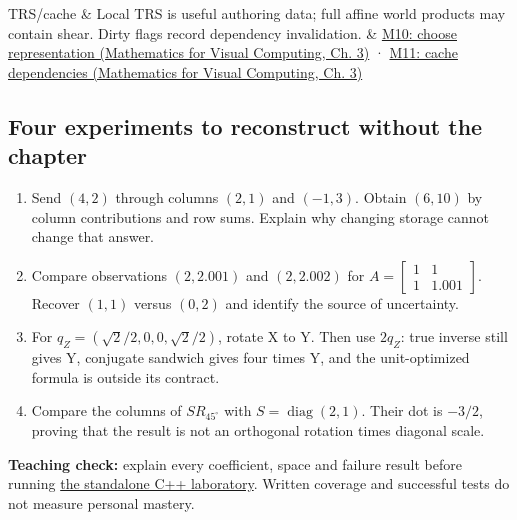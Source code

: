 {\begin{longtable}[]
TRS/cache & Local TRS is useful authoring data; full affine world products may contain shear. Dirty flags record dependency invalidation. & \href{../02-Mathematics-for-Visual-Computing/main.pdf\#nameddest=01-foundations-i-ch019-figure-m10---representation-follows-the-permitted-operation}{M10: choose representation (Mathematics for Visual Computing, Ch. 3)} · \href{../02-Mathematics-for-Visual-Computing/main.pdf\#nameddest=01-foundations-i-ch019-figure-m11---invalidate-the-values-that-actually-depend-on-the-edit}{M11: cache dependencies (Mathematics for Visual Computing, Ch. 3)} \\
\end{longtable}
}

\subsection{Four experiments to reconstruct without the chapter}\label{appendix-68f22c734be3-four-experiments-to-reconstruct-without-the-chapter}

\hypertarget{appendix-68f22c734be3-four-experiments-to-reconstruct-without-the-chapter}{}

\begin{enumerate}
\def\labelenumi{\arabic{enumi}.}
\tightlist
\item
  Send \((4,2)\) through columns \((2,1)\) and \((-1,3)\). Obtain \((6,10)\) by column contributions and row sums. Explain why changing storage cannot change that answer.
\item
  Compare observations \((2,2.001)\) and \((2,2.002)\) for \(A=\begin{bmatrix}1&1\\1&1.001\end{bmatrix}\). Recover \((1,1)\) versus \((0,2)\) and identify the source of uncertainty.
\item
  For \(q_Z=(\sqrt2/2,0,0,\sqrt2/2)\), rotate X to Y. Then use \(2q_Z\): true inverse still gives Y, conjugate sandwich gives four times Y, and the unit-optimized formula is outside its contract.
\item
  Compare the columns of \(S R_{45^\circ}\) with \(S=\operatorname{diag}(2,1)\). Their dot is \(-3/2\), proving that the result is not an orthogonal rotation times diagonal scale.
\end{enumerate}

\textbf{Teaching check:} explain every coefficient, space and failure result before running \hyperref[02-foundations-ii-ch038-a-complete-scalar-laboratory-makes-the-contracts-observable]{the standalone C++ laboratory}. Written coverage and successful tests do not measure personal mastery.

